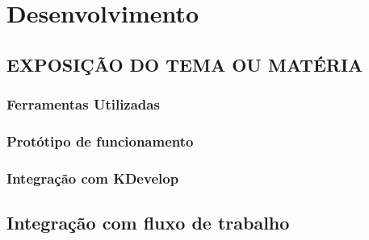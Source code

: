 \chapter{Desenvolvimento}
\lipsum[1-4]

\section{EXPOSIÇÃO DO TEMA OU MATÉRIA}
\lipsum[1-4]

\subsection{Ferramentas Utilizadas}
\lipsum[1-4]

\subsection{Protótipo de funcionamento}
\lipsum[1-4]

\subsection{Integração com KDevelop}
\lipsum[1-4]

\section{Integração com fluxo de trabalho}
\lipsum[1-4]

